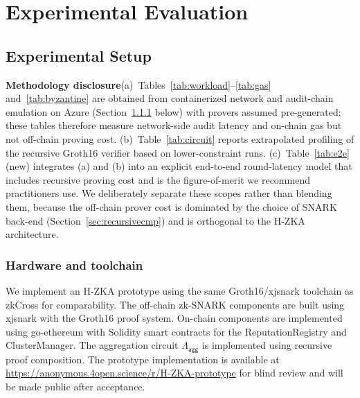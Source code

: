 \documentclass[journal]{IEEEtran}
\newcommand{\aggCircuit}{\Lambda_{\mathsf{agg}}}
\begin{document}
\section{Experimental Evaluation}

\subsection{Experimental Setup}

\textbf{Methodology disclosure}(a)~Tables~\ref{tab:workload}--\ref{tab:gas} and~\ref{tab:byzantine} are obtained from {containerized network and audit-chain emulation} on Azure (Section~\ref{sec:setup-detail} below) with provers assumed pre-generated; these tables therefore measure {network-side audit latency} and {on-chain gas} but not off-chain proving cost. (b)~Table~\ref{tab:circuit} reports {extrapolated profiling} of the recursive Groth16 verifier based on lower-constraint runs. (c)~Table~\ref{tab:e2e} (new) integrates (a) and (b) into an explicit {end-to-end} round-latency model that {includes} recursive proving cost and is the figure-of-merit we recommend practitioners use. We deliberately separate these scopes rather than blending them, because the off-chain prover cost is dominated by the choice of SNARK back-end (Section~\ref{sec:recursivecmp}) and is orthogonal to the H-ZKA architecture.

\subsubsection{Hardware and toolchain}
\label{sec:setup-detail}
We implement an H-ZKA prototype using the same Groth16/xjsnark toolchain as zkCross for comparability. The off-chain zk-SNARK components are built using xjsnark with the Groth16 proof system. On-chain components are implemented using go-ethereum with Solidity smart contracts for the ReputationRegistry and ClusterManager. The aggregation circuit $\aggCircuit$ is implemented using recursive proof composition. The prototype implementation is available at \url{https://anonymous.4open.science/r/H-ZKA-prototype} for blind review and will be made public after acceptance.
\end{document}
